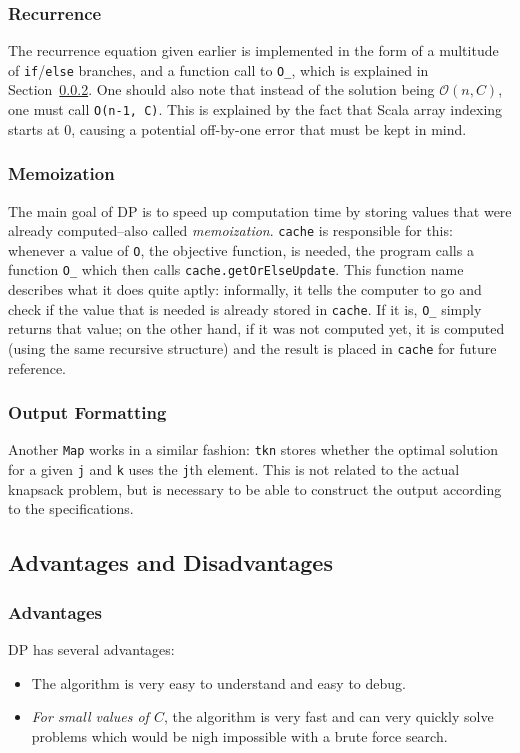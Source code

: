 \documentclass[journal]{IEEEtran}
\newcommand{\scala}[1]{\texttt{#1}}
\begin{document}
\subsubsection{Recurrence}
The recurrence equation given earlier is implemented in the form of a multitude of \scala{if}/\scala{else} branches, and a function call to \scala{O_}, which is explained in Section~\ref{sec:dpmemo}.
One should also note that instead of the solution being \(\mathscr{O}(n, C)\), one must call \scala{O(n-1, C)}.
This is explained by the fact that Scala array indexing starts at 0, causing a potential off-by-one error that must be kept in mind.
\subsubsection{Memoization}
\label{sec:dpmemo}
The main goal of DP is to speed up computation time by storing values that were already computed--also called \emph{memoization}.
\scala{cache} is responsible for this: whenever a value of \scala{O}, the objective function, is needed, the program calls a function \scala{O_} which then calls \scala{cache.getOrElseUpdate}.
This function name describes what it does quite aptly: informally, it tells the computer to go and check if the value that is needed is already stored in \scala{cache}.
If it is, \scala{O_} simply returns that value; on the other hand, if it was not computed yet, it is computed (using the same recursive structure) and the result is placed in \scala{cache} for future reference.
\subsubsection{Output Formatting}
\label{sec:dpoutput}
Another \scala{Map} works in a similar fashion: \scala{tkn} stores whether the optimal solution for a given \scala{j} and \scala{k} uses the \scala{j}th element.
This is not related to the actual knapsack problem, but is necessary to be able to construct the output according to the specifications.

\subsection{Advantages and Disadvantages}
\subsubsection{Advantages}
DP has several advantages:
\begin{itemize}
	\item The algorithm is very easy to understand and easy to debug.
	\item \emph{For small values of \(C\)}, the algorithm is very fast and can very quickly solve problems which would be nigh impossible with a brute force search.
\end{itemize}
\end{document}
